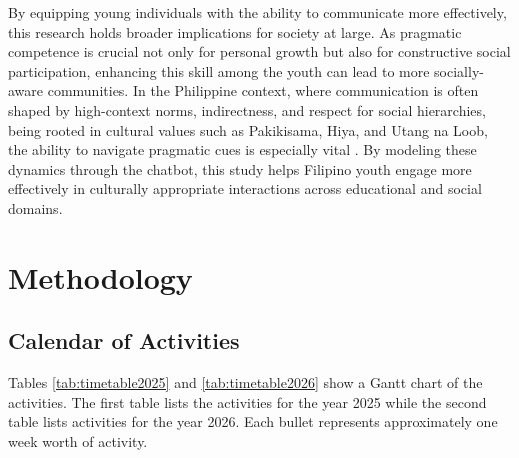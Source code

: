 By equipping young individuals with the ability to communicate more effectively, this research holds broader implications for society at large. As pragmatic competence is 
crucial not only for personal growth but also for constructive social participation, enhancing this skill among the youth can lead to more socially-aware communities. 
In the Philippine context, where communication is often shaped by high-context norms, indirectness, and respect for social hierarchies, being rooted in cultural values such as 
Pakikisama, Hiya, and Utang na Loob, the ability to navigate pragmatic cues is especially vital \cite{jocano_filipino_1997}. By modeling these dynamics through 
the chatbot, this study helps Filipino youth engage more effectively in culturally appropriate interactions across educational and social domains.

\clearpage %
\section{Methodology}

\subsection{Calendar of Activities}
Tables \ref{tab:timetable2025} and \ref{tab:timetable2026} show a Gantt chart of the activities. The first table lists the activities 
for the year 2025 while the second table lists activities for the year 2026. Each bullet represents approximately one week worth of activity.

